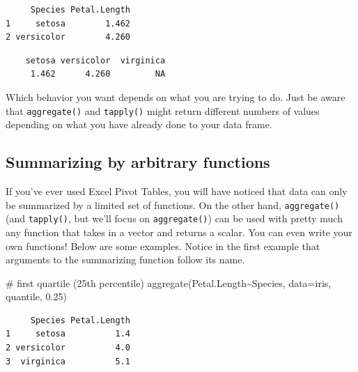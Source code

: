 \documentclass[
  13,
  letterpaper,
]{report}
\newenvironment{Shaded}{\begin{snugshade}}{\end{snugshade}}
\newcommand{\AttributeTok}[1]{\textcolor[rgb]{0.40,0.45,0.13}{#1}}
\newcommand{\CommentTok}[1]{\textcolor[rgb]{0.37,0.37,0.37}{#1}}
\newcommand{\DecValTok}[1]{\textcolor[rgb]{0.68,0.00,0.00}{#1}}
\newcommand{\FloatTok}[1]{\textcolor[rgb]{0.68,0.00,0.00}{#1}}
\newcommand{\FunctionTok}[1]{\textcolor[rgb]{0.28,0.35,0.67}{#1}}
\newcommand{\NormalTok}[1]{\textcolor[rgb]{0.00,0.23,0.31}{#1}}
\newcommand{\SpecialCharTok}[1]{\textcolor[rgb]{0.37,0.37,0.37}{#1}}
\begin{document}
\begin{verbatim}
     Species Petal.Length
1     setosa        1.462
2 versicolor        4.260
\end{verbatim}

\begin{Shaded}
\end{Shaded}

\begin{verbatim}
    setosa versicolor  virginica 
     1.462      4.260         NA 
\end{verbatim}

Which behavior you want depends on what you are trying to do. Just be
aware that \texttt{aggregate()} and \texttt{tapply()} might return
different numbers of values depending on what you have already done to
your data frame.

\subsection{Summarizing by arbitrary
functions}\label{summarizing-by-arbitrary-functions}

If you've ever used Excel Pivot Tables, you will have noticed that data
can only be summarized by a limited set of functions. On the other hand,
\texttt{aggregate()} (and \texttt{tapply()}, but we'll focus on
\texttt{aggregate()}) can be used with pretty much any function that
takes in a vector and returns a scalar. You can even write your own
functions! Below are some examples. Notice in the first example that
arguments to the summarizing function follow its name.

\begin{Shaded}
\begin{Highlighting}[]
\CommentTok{\# first quartile (25th percentile)}
\FunctionTok{aggregate}\NormalTok{(Petal.Length}\SpecialCharTok{\textasciitilde{}}\NormalTok{Species, }\AttributeTok{data=}\NormalTok{iris, quantile, }\FloatTok{0.25}\NormalTok{)}
\end{Highlighting}
\end{Shaded}

\begin{verbatim}
     Species Petal.Length
1     setosa          1.4
2 versicolor          4.0
3  virginica          5.1
\end{verbatim}
\end{document}
